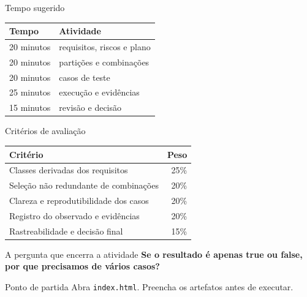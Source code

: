 \begin{frame}{Tempo sugerido}
  \small
  \begin{tabular}{p{35mm}p{72mm}}
    \toprule
    \textbf{Tempo} & \textbf{Atividade}\\
    \midrule
    20 minutos & requisitos, riscos e plano\\
    20 minutos & partições e combinações\\
    20 minutos & casos de teste\\
    25 minutos & execução e evidências\\
    15 minutos & revisão e decisão\\
    \bottomrule
  \end{tabular}
\end{frame}

\begin{frame}{Critérios de avaliação}
  \small
  \begin{tabular}{p{91mm}r}
    \toprule
    \textbf{Critério} & \textbf{Peso}\\
    \midrule
    Classes derivadas dos requisitos & 25\%\\
    Seleção não redundante de combinações & 20\%\\
    Clareza e reprodutibilidade dos casos & 20\%\\
    Registro do observado e evidências & 20\%\\
    Rastreabilidade e decisão final & 15\%\\
    \bottomrule
  \end{tabular}
\end{frame}

\begin{frame}{A pergunta que encerra a atividade}
  \centering
  \vfill
  {\LARGE\color{azulinstitucional}\bfseries
    Se o resultado é apenas true ou false,\\[3mm]
    por que precisamos de vários casos?}
  \vfill
  \begin{block}{Ponto de partida}
    Abra \texttt{index.html}. Preencha os artefatos antes de executar.
  \end{block}
\end{frame}

